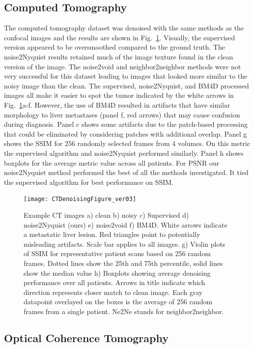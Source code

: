 \documentclass[12pt]{spieman}
\begin{document}
\begin{spacing}{2}
\subsection{Computed Tomography}
The computed tomography dataset was denoised with the same methods as the confocal images and the results are shown in Fig.~\ref{fig:ctResults}. Visually, the supervised version appeared to be oversmoothed compared to the ground truth. The noise2Nyquist results retained much of the image texture found in the clean version of the image. The noise2void and neighbor2neighbor methods were not very successful for this dataset leading to images that looked more similar to the noisy image than the clean. The supervised, noise2Nyquist, and BM4D processed images all make it easier to spot the tumor indicated by the white arrows in Fig.~\ref{fig:ctResults}a-f. However, the use of BM4D resulted in artifacts that have similar morphology to liver metastases (panel f, red arrows) that may cause confusion during diagnosis. Panel c shows some artifacts due to the patch-based processing that could be eliminated by considering patches with additional overlap. Panel g shows the SSIM for 256 randomly selected frames from 4 volumes. On this metric the supervised algorithm and noise2Nyquist performed similarly. Panel h shows boxplots for the average metric value across all patients. For PSNR our noise2Nyquist method performed the best of all the methods investigated. It tied the supervised algorithm for best performance on SSIM.

\begin{figure}[htb]
	\begin{center}
		\texttt{[image: CTDenoisingFigure\_ver03]}
		\caption{\label{fig:ctResults}Example CT images a) clean b) noisy c) Supervised d) noise2Nyquist (ours) e) noise2void f) BM4D. White arrows indicate a metastatic liver lesion. Red triangles point to potentially misleading artifacts. Scale bar applies to all images. g) Violin plots of SSIM for representative patient scans based on 256 random frames. Dotted lines show the 25th and 75th percentile, solid lines show the median value h) Boxplots showing average denoising performance over all patients. Arrows in title indicate which direction represents closer match to clean image. Each gray datapoint overlayed on the boxes is the average of 256 random frames from a single patient. Ne2Ne stands for neighbor2neighbor.}
	\end{center}
\end{figure}

\subsection{Optical Coherence Tomography}


\end{spacing}
\end{document}
